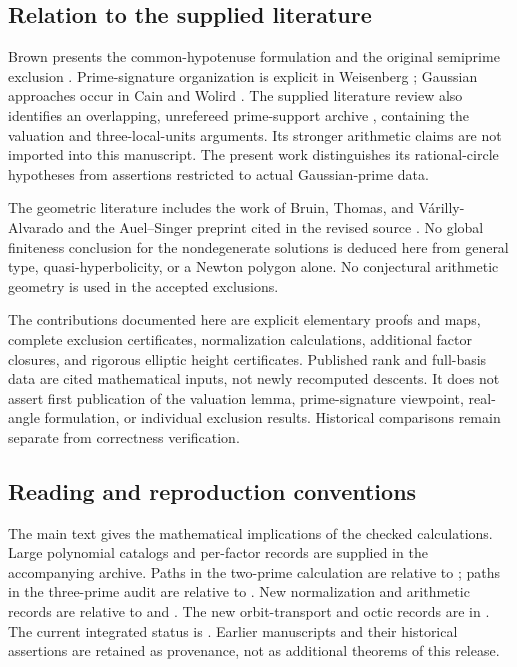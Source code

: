 \documentclass[11pt,letterpaper]{article}
\theoremstyle{definition}\newtheorem{definition}[theorem]{Definition}
\theoremstyle{remark}\newtheorem{remark}[theorem]{Remark}
\begin{document}
\subsection*{Relation to the supplied literature}
Brown presents the common-hypotenuse formulation and the original semiprime exclusion \cite{Brown511,Brown417}. Prime-signature organization is explicit in Weisenberg \cite{Weisenberg}; Gaussian approaches occur in Cain and Wolird \cite{Cain,Wolird}. The supplied literature review also identifies an overlapping, unrefereed prime-support archive \cite{Schwarz}, containing the valuation and three-local-units arguments. Its stronger arithmetic claims are not imported into this manuscript. The present work distinguishes its rational-circle hypotheses from assertions restricted to actual Gaussian-prime data.

The geometric literature includes the work of Bruin, Thomas, and V\'arilly-Alvarado and the Auel--Singer preprint cited in the revised source \cite{BTV,AS}. No global finiteness conclusion for the nondegenerate solutions is deduced here from general type, quasi-hyperbolicity, or a Newton polygon alone. No conjectural arithmetic geometry is used in the accepted exclusions.

The contributions documented here are explicit elementary proofs and maps, complete exclusion certificates, normalization calculations, additional factor closures, and rigorous elliptic height certificates. Published rank and full-basis data are cited mathematical inputs, not newly recomputed descents. It does not assert first publication of the valuation lemma, prime-signature viewpoint, real-angle formulation, or individual exclusion results. Historical comparisons remain separate from correctness verification.

\subsection*{Reading and reproduction conventions}
The main text gives the mathematical implications of the checked calculations. Large polynomial catalogs and per-factor records are supplied in the accompanying archive. Paths in the two-prime calculation are relative to ; paths in the three-prime audit are relative to . New normalization and arithmetic records are relative to  and . The new orbit-transport and octic records are in . The current integrated status is . Earlier manuscripts and their historical assertions are retained as provenance, not as additional theorems of this release.
\end{document}
